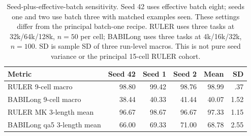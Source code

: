 \begin{table}[htbp]
\centering
\small
\setlength{\tabcolsep}{4pt}
\begin{tabular}{@{}lrrrrr@{}}
\toprule
Metric & Seed 42 & Seed 1 & Seed 2 & Mean & SD \\
\midrule
RULER 9-cell macro & 98.80 & 99.42 & 98.76 & 98.99 & .37 \\
BABILong 9-cell macro & 38.44 & 40.33 & 41.44 & 40.07 & 1.52 \\
RULER MK 3-length mean & 96.67 & 98.67 & 96.67 & 97.33 & 1.15 \\
BABILong qa5 3-length mean & 66.00 & 69.33 & 71.00 & 68.78 & 2.55 \\
\bottomrule
\end{tabular}
\caption{Seed-plus-effective-batch sensitivity. Seed 42 uses effective batch eight; seeds one and two use batch three with matched examples seen. These settings differ from the principal batch-one recipe. RULER uses three tasks at 32k/64k/128k, $n=50$ per cell; BABILong uses three tasks at 4k/16k/32k, $n=100$. SD is sample SD of three run-level macros. This is not pure seed variance or the principal 15-cell RULER cohort.}
\label{tab:run-robustness}
\end{table}
